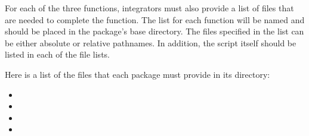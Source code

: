 For each of the three functions, integrators must also provide a list
of files that are needed to complete the function. The list for each
function will be named  and should be
placed in the package's base directory. The files specified in the
list can be either absolute or relative pathnames. In addition, the
 script itself should be listed in each of the file
lists.

Here is a list of the files that each package must provide in its
directory:

\begin{itemize}
\item {}
\item {}
\item {}
\item {}
\end{itemize}

